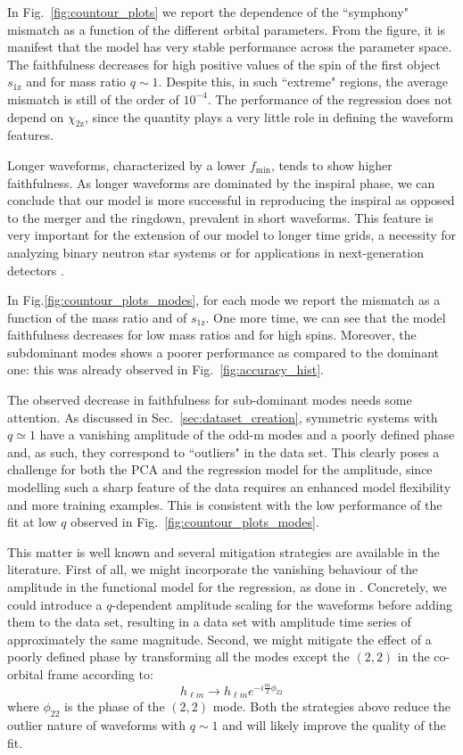 \documentclass[twocolumn,showpacs,preprintnumbers,nofootinbib,prd,
superscriptaddress,10pt]{revtex4-2}
\begin{document}
In Fig.~\ref{fig:countour_plots} we report the dependence of the ``symphony" mismatch as a function of the different orbital parameters.
From the figure, it is manifest that the model has very stable performance across the parameter space.
The faithfulness decreases for high positive values of the spin of the first object $s_\text{1z}$ and for mass ratio $q\sim 1$. Despite this, in such ``extreme" regions, the average mismatch is still of the order of $10^{-4}$.
The performance of the regression does not depend on $\chi_\text{2z}$, since the quantity plays a very little role in defining the waveform features.

Longer waveforms, characterized by a lower $f_\textrm{min}$, tends to show higher faithfulness. As longer waveforms are dominated by the inspiral phase, we can conclude that our model is more successful in reproducing the inspiral as opposed to the merger and the ringdown, prevalent in short waveforms.
This feature is very important for the extension of our model to longer time grids, a necessity for analyzing binary neutron star systems or for applications in next-generation detectors \cite{Purrer:2019jcp}.

In Fig.\ref{fig:countour_plots_modes}, for each mode we report the mismatch as a function of the mass ratio and of $s_\text{1z}$. One more time, we can see that the model faithfulness decreases for low mass ratios and for high spins. Moreover, the subdominant modes shows a poorer performance as compared to the dominant one: this was already observed in Fig.~\ref{fig:accuracy_hist}.

The observed decrease in faithfulness for sub-dominant modes needs some attention.
As discussed in Sec.~\ref{sec:dataset_creation}, symmetric systems with $q \simeq 1$ have a vanishing amplitude of the odd-m modes and a poorly defined phase and, as such, they correspond to ``outliers" in the data set. This clearly poses a challenge for both the PCA and the regression model for the amplitude, since modelling such a sharp feature of the data requires an enhanced model flexibility and more training examples.
This is consistent with the low performance of the fit at low $q$ observed in Fig.~\ref{fig:countour_plots_modes}.

This matter is well known and several mitigation strategies are available in the literature.
First of all, we might incorporate the vanishing behaviour of the amplitude in the functional model for the regression, as done in \cite{Blackman:2015pia}. Concretely, we could introduce a $q$-dependent amplitude scaling for the waveforms before adding them to the data set, resulting in a data set with amplitude time series of approximately the same magnitude.
Second, we might mitigate the effect of a poorly defined phase by transforming all the modes except the $(2,2)$ in the co-orbital frame \cite{Varma:2018mmi} according to:
\begin{equation}
	h_{\ell m} \rightarrow h_{\ell m} e^{-i\frac{m}{2}\phi_{22}}
\end{equation}
where $\phi_{22}$ is the phase of the $(2,2)$ mode.
Both the strategies above reduce the outlier nature of waveforms with $q \sim 1$ and will likely improve the quality of the fit.
\end{document}
